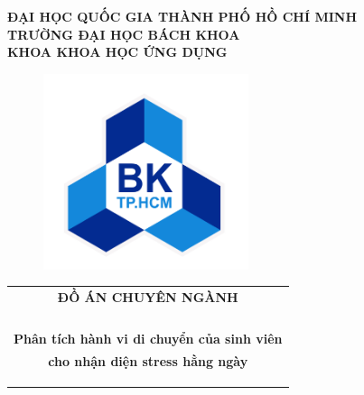 \documentclass[13pt,a4paper,font=cm]{report}
\theoremstyle{definition}
\begin{document}
\begin{titlepage}


\begin{center}
\LARGE \textbf{ĐẠI HỌC QUỐC GIA THÀNH PHỐ HỒ CHÍ MINH} \\
\vspace{0.2cm}
\LARGE \textbf{TRƯỜNG ĐẠI HỌC BÁCH KHOA} \\
\vspace{0.2cm}
\LARGE \textbf{KHOA KHOA HỌC ỨNG DỤNG}
\end{center}

\vspace{0.3cm}

\begin{figure}[h!]
\begin{center}
\includegraphics[width=6cm]{Images/hcmut.png}
\end{center}
\end{figure}

\begin{center}
\begin{tabular}{c}
\multicolumn{1}{c}{\textbf{{\LARGE ĐỒ ÁN CHUYÊN NGÀNH}}}\\
\\{\textbf{{\Huge }}}
\\
\\
\\ \textbf{\Huge Phân tích hành vi di chuyển của sinh viên } \\ \textbf{\Huge cho nhận diện stress hằng ngày}
\\
\\
\\
\\



\end{tabular}
\end{center}
\end{titlepage}
\end{document}
